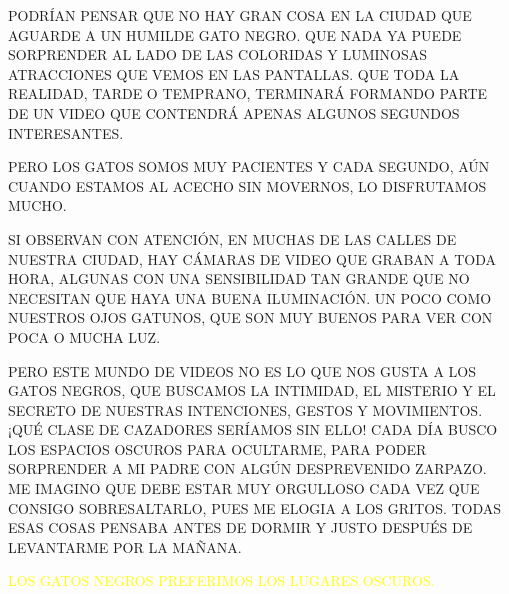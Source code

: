 PODRÍAN PENSAR QUE NO HAY GRAN COSA EN LA CIUDAD QUE AGUARDE A UN HUMILDE GATO NEGRO. QUE NADA YA PUEDE SORPRENDER AL LADO DE LAS COLORIDAS Y LUMINOSAS ATRACCIONES QUE VEMOS EN LAS PANTALLAS. QUE TODA LA REALIDAD, TARDE O TEMPRANO, TERMINARÁ FORMANDO PARTE DE UN VIDEO QUE CONTENDRÁ APENAS ALGUNOS SEGUNDOS INTERESANTES.

PERO LOS GATOS SOMOS MUY PACIENTES Y CADA SEGUNDO, AÚN CUANDO ESTAMOS AL ACECHO SIN MOVERNOS, LO DISFRUTAMOS MUCHO.




\newpage
{} 
SI OBSERVAN CON ATENCIÓN, EN MUCHAS DE LAS CALLES DE NUESTRA CIUDAD, HAY CÁMARAS DE VIDEO QUE GRABAN A TODA HORA, ALGUNAS CON UNA SENSIBILIDAD TAN GRANDE QUE NO NECESITAN QUE HAYA UNA BUENA ILUMINACIÓN. UN POCO COMO NUESTROS OJOS GATUNOS, QUE SON MUY BUENOS PARA VER CON POCA O MUCHA LUZ. 

PERO ESTE MUNDO DE VIDEOS NO ES LO QUE NOS GUSTA A LOS GATOS NEGROS, QUE BUSCAMOS LA INTIMIDAD, EL MISTERIO Y EL SECRETO DE NUESTRAS INTENCIONES, GESTOS Y MOVIMIENTOS. ¡QUÉ CLASE DE CAZADORES SERÍAMOS SIN ELLO!
CADA DÍA BUSCO LOS ESPACIOS OSCUROS PARA OCULTARME, PARA PODER SORPRENDER A MI PADRE CON ALGÚN DESPREVENIDO ZARPAZO. ME IMAGINO QUE DEBE ESTAR MUY ORGULLOSO CADA VEZ QUE CONSIGO SOBRESALTARLO, PUES ME ELOGIA A LOS GRITOS. TODAS ESAS COSAS PENSABA ANTES DE DORMIR Y JUSTO DESPUÉS DE LEVANTARME POR LA MAÑANA.


\newpage
{}

\vspace{.8\textheight}
\textcolor{yellow}{LOS GATOS NEGROS PREFERIMOS LOS LUGARES OSCUROS.}		

